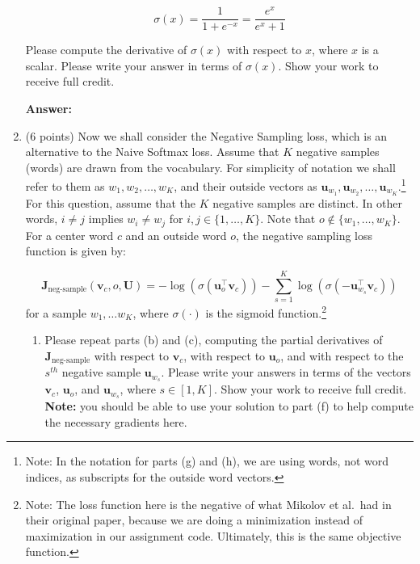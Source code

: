 \documentclass{article}
\newenvironment{answer}{
    {\bf Answer:} \sf \begingroup\color{red}
}{\endgroup}%
\begin{document}
\begin{enumerate}[label=(\alph*)]
\begin{equation}
    \label{Sigmoid Function}
    \sigma (x) = \frac{1}{1 + e^{-x}} = \frac{e^{x}}{e^{x} + 1}
\end{equation}

Please compute the derivative of $\sigma(x)$ with respect to $x$, where $x$ is a scalar. Please write your answer in terms of $\sigma(x)$. Show your work to receive full credit.

\begin{shaded}
\begin{answer}

\end{answer}
\end{shaded}

\item (6 points) Now we shall consider the Negative Sampling loss, which is an alternative to the Naive Softmax loss.  Assume that $K$ negative samples (words) are drawn from the vocabulary. For simplicity of notation we shall refer to them as $w_1, w_2, \dots, w_K$, and their outside vectors as $\bm u_{w_1}, \bm u_{w_2}, \dots, \bm u_{w_K}$.\footnote{Note: In the notation for parts (g) and (h), we are using words, not word indices, as subscripts for the outside word vectors.} For this question, assume that the $K$ negative samples are distinct. In other words, $i\neq j$ implies $w_i\neq w_j$ for $i,j\in\{1,\dots,K\}$.
Note that $o\notin\{w_1, \dots, w_K\}$. 
For a center word $c$ and an outside word $o$, the negative sampling loss function is given by:

\begin{equation}
\bm J_{\text{neg-sample}}(\bm v_c, o, \bm U) = -\log(\sigma(\bm u_o^\top \bm v_c)) - \sum_{s=1}^K \log(\sigma(-\bm u_{w_s}^\top \bm v_c))
\end{equation}
for a sample $w_1, \ldots w_K$, where $\sigma(\cdot)$ is the sigmoid function.\footnote{Note: The loss function here is the negative of what Mikolov et al.\ had in their original paper, because we are doing a minimization instead of maximization in our assignment code. Ultimately, this is the same objective function.}

\begin{enumerate}[label=(\roman*)]
\item Please repeat parts (b) and (c), computing the partial derivatives of $\bm J_{\text{neg-sample}}$ with respect to $\bm v_c$, with respect to $\bm u_o$, and with respect to the $s^{th}$ negative sample $\bm u_{w_s}$. Please write your answers in terms of the vectors $\bm v_c$, $\bm u_o$, and $\bm u_{w_s}$, where $s \in [1, K]$. Show your work to receive full credit. \textbf{Note:} you should be able to use your solution to part (f) to help compute the necessary gradients here.


\end{enumerate}
\end{enumerate}
\end{document}
